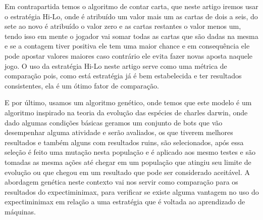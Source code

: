     Em contrapartida temos o algoritmo de contar carta, que neste artigo iremos usar o estratégia Hi-Lo, onde é 
    atribuído um valor mais um as cartas de dois a seis, do sete ao novo é atribuído o valor zero e as cartas restantes 
    o valor menos um, tendo isso em mente o jogador vai somar todas as cartas que são dadas na mesma e se a contagem tiver 
    positiva ele tem uma maior chance e em consequência ele pode apostar valores maiores caso contrário ele evita fazer novas 
    aposta naquele jogo. O uso da estratégia Hi-Lo neste artigo serve como uma métrica de comparação pois, como está estratégia 
    já é bem estabelecida e ter resultados consistentes, ela é um ótimo fator de comparação. \cite{hi-lo-system} \cite{hi-lo-counting-card}

    E por último, usamos um algoritmo genético, onde temos que este modelo é um algoritmo inspirado na teoria da evolução das
    espécies de charles darwin, onde dado algumas condições básicas geramos um conjunto de bots que vão desempenhar alguma
    atividade e serão avaliados, os que tiverem melhores resultados e também alguns com resultados ruins, são selecionados,
    após essa seleção é feito uma mutação nesta população e é aplicado aos mesmo testes e são tomadas as mesma ações até chegar
    em um população que atingiu seu limite de evolução ou que chegou em um resultado que pode ser considerado aceitável. A abordagem
    genética neste contexto vai nos servir como comparação para os resultados do expectiminimax, para verificar se existe alguma vantagem
    no uso do expectiminimax em relação a uma estratégia que é voltada ao aprendizado de máquinas.   

    

    
